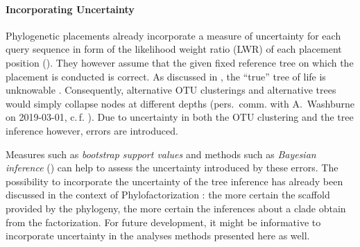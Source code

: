 \paragraph{Incorporating Uncertainty}
\label{ch:ConclusionOutlook:sec:AnalysisMethods:par:Uncertainty}


Phylogenetic placements already incorporate a measure of uncertainty for each query sequence
in form of the likelihood weight ratio (LWR) of each placement position
().
They however assume that the given fixed reference tree on which the placement is conducted is correct.
As discussed in ,
the ``true'' tree of life is unknowable \cite{Haber2005}.
Consequently, alternative OTU clusterings and alternative trees would simply collapse nodes at different depths
(pers.~comm. with A.~Washburne on 2019-03-01, c.\,f. ).
Due to uncertainty in both the OTU clustering and the tree inference however, errors are introduced.

Measures such as \emph{bootstrap support values} \cite{Efron1979,Felsenstein1985a,Soltis2003}
and methods such as \emph{Bayesian inference} ()
can help to assess the uncertainty introduced by these errors.
The possibility to incorporate the uncertainty of the tree inference
has already been discussed in the context of Phylofactorization \cite{Washburne2019}:
the more certain the scaffold provided by the phylogeny,
the more certain the inferences about a clade obtain from the factorization.
For future development, it might be informative to incorporate uncertainty in the analyses methods presented here as well.


